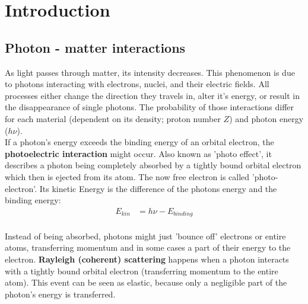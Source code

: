 
\chapter{Introduction}
\label{chap:intro}

\section{Photon - matter interactions}
\label{sec:photon}

As light passes through matter, its intensity decreases.
This phenomenon is due to photons interacting with electrons, nuclei, and their electric fields.
All processes either change the direction they travels in, alter it's energy, or result in the disappearance of single photons.
The probability of those interactions differ for each material (dependent on its density; proton number $Z$) and photon energy ($h\nu$). \\

If a photon's energy exceeds the binding energy of an orbital electron, the \textbf{photoelectric interaction} might occur.
Also known as 'photo effect', it describes a photon being completely absorbed by a tightly bound orbital electron which then is ejected from its atom.
The now free electron is called 'photo-electron'. Its kinetic Energy is the difference of the photons energy and the binding energy:
\begin{align}
E_{kin} &= h\nu - E_{binding}
\end{align} \\

Instead of being absorbed, photons might just 'bounce off' electrons or entire atoms, transferring momentum and in some cases a part of their energy to the electron.
\textbf{Rayleigh (coherent) scattering} happens when a photon interacts with a tightly bound orbital electron (transferring momentum to the entire atom).
This event can be seen as elastic, because only a negligible part of the photon's energy is transferred.

